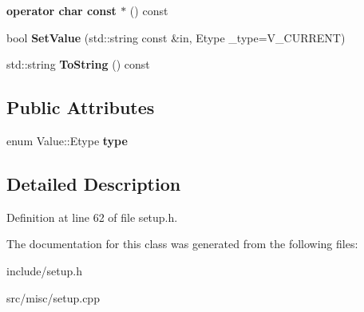 \begin{DoxyCompactItemize}
\item 
\hypertarget{classValue_a34c3d3e97da4667b1ac6932b3a16fb92}{{\bfseries operator char const $\ast$} () const }\label{classValue_a34c3d3e97da4667b1ac6932b3a16fb92}

\item 
\hypertarget{classValue_a7c785d7517533757bf9b3f7a15cc4e6a}{bool {\bfseries Set\-Value} (std\-::string const \&in, Etype \-\_\-type=V\-\_\-\-C\-U\-R\-R\-E\-N\-T)}\label{classValue_a7c785d7517533757bf9b3f7a15cc4e6a}

\item 
\hypertarget{classValue_a31428e493a421f64254f84cf5fe114f1}{std\-::string {\bfseries To\-String} () const }\label{classValue_a31428e493a421f64254f84cf5fe114f1}

\end{DoxyCompactItemize}
\subsection*{Public Attributes}
\begin{DoxyCompactItemize}
\item 
\hypertarget{classValue_aa8611755fd5d52ca0e16f5cd8caed48f}{enum Value\-::\-Etype {\bfseries type}}\label{classValue_aa8611755fd5d52ca0e16f5cd8caed48f}

\end{DoxyCompactItemize}


\subsection{Detailed Description}


Definition at line 62 of file setup.\-h.



The documentation for this class was generated from the following files\-:\begin{DoxyCompactItemize}
\item 
include/setup.\-h\item 
src/misc/setup.\-cpp\end{DoxyCompactItemize}
